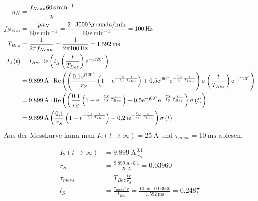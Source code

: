 \documentclass[11pt,a4paper]{scrartcl}
\newcommand{\mybr}[1]{\left(#1\right)}
\renewcommand{\j}{\mathrm{j}}
\renewcommand{\i}{\underline{i}}
\newcommand{\0}{_{\mybr{0}}}
\newcommand{\1}{_{\mybr{1}}}
\newcommand{\2}{_{\mybr{2}}}
\renewcommand{\e}{\mathrm{e}}
\renewcommand{\Re}{\mathrm{Re}}
\begin{document}
\section{}
\begin{align}
	n_N&=\frac{f_{Nenn}\SI{60}{\second\per\minute}}{p}\\
	f_{Nenn}&=\frac{p n_N}{\SI{60}{\second\per\minute}}=\frac{2\cdot\SI{3000}{\rounds\per\minute}}{\SI{60}{\second\per\minute}}=\SI{100}{\hertz}\\
	T_{Bez}&=\frac{1}{2\pi f_{Nenn}}=\frac{1}{2\pi\SI{100}{\hertz}}=\SI{1.592}{\milli\second}\\
	I_2\mybr{t}&=I_{Bez}\Re\mybr{\i_S\mybr{\frac{t}{T_{Bez}}}\e^{-\j\SI{120}{\degree}}}\\
	&=\SI{9.899}{\ampere}\cdot\Re\mybr{\mybr{\frac{\num{0.1}\e^{\j\SI{120}{\degree}}}{r_S}\mybr{1-\e^{-\frac{r_S}{l_S}\frac{t}{T_{Bez}}}}+\num{0.5}\e^{\j\SI{60}{\degree}}\e^{-\frac{r_S}{l_S}\frac{t}{T_{Bez}}}}\sigma\mybr{\frac{t}{T_{Bez}}}\e^{-\j\SI{120}{\degree}}}\\
	&=\SI{9.899}{\ampere}\cdot\Re\mybr{\mybr{\frac{\num{0.1}}{r_S}\mybr{1-\e^{-\frac{r_S}{l_S}\frac{t}{T_{Bez}}}}+\num{0.5}\e^{-\j\SI{60}{\degree}}\e^{-\frac{r_S}{l_S}\frac{t}{T_{Bez}}}}\sigma\mybr{t}}\\
	&=\SI{9.899}{\ampere}\mybr{\frac{\num{0.1}}{r_S}\mybr{1-\e^{-\frac{r_S}{l_S}\frac{t}{T_{Bez}}}}-\num{0.25}\e^{-\frac{r_S}{l_S}\frac{t}{T_{Bez}}}}\sigma\mybr{t}\\
\end{align}
Aus der Messkurve kann man $I_2\mybr{t\rightarrow\infty}=\SI{25}{\ampere}$ und $\tau_{mess}=\SI{10}{\milli\second}$ ablesen.
\begin{figure*}[!htbp]
	\centering
\end{figure*}
\begin{align}
	I_2\mybr{t\rightarrow\infty}&=\SI{9.899}{\ampere}\frac{\num{0.1}}{r_S}\\
	r_S&=\frac{\SI{9.899}{\ampere}\cdot\num{0.1}}{\SI{25}{\ampere}}=\num{0.03960}\\
	\tau_{mess}&=T_{Bez}\frac{l_S}{r_S}\\
	l_S&=\frac{\tau_{mess}r_S}{T_{Bez}}=\frac{\SI{10}{\milli\second}\cdot\num{0.03960}}{\SI{1.592}{\milli\second}}=\num{0.2487}
\end{align}
\end{document}
